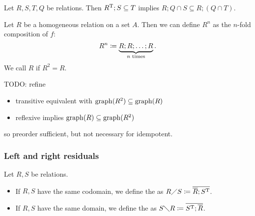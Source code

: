 \begin{lemma}
Let $R,S,T, Q$ be relations. Then $R^{\mathrm{T}}; S \subseteq T$ implies $R;Q\cap S \subseteq R; (Q\cap T)$.
\end{lemma}

\begin{definition}
Let $R$ be a homogeneous relation on a set $A$. Then we can define $R^n$ as the $n$-fold composition of $f$:
\[ R^n \coloneqq \underbrace{R;R; \ldots ;R}_{\text{$n$ times}}. \]
We call $R$  if $R^2 = R$.
\end{definition}

TODO: refine
\begin{proposition}
\begin{itemize}
\item transitive equivalent with $\operatorname{graph}(R^2) \subseteq \operatorname{graph}(R)$
\item reflexive implies $\operatorname{graph}(R) \subseteq \operatorname{graph}(R^2)$
\end{itemize}
\end{proposition}
so preorder sufficient, but not necessary for idempotent.

\subsubsection{Left and right residuals}
\begin{definition}
Let $R,S$ be relations.
\begin{itemize}
\item If $R,S$ have the same codomain, we define the  as $R\diagup S \coloneqq \overline{\overline{R}; S^{\mathrm{T}}}$.
\item If $R,S$ have the same domain, we define the  as $S\diagdown R \coloneqq \overline{S^{\mathrm{T}}; \overline{R}}$.
\end{itemize}
\end{definition}

